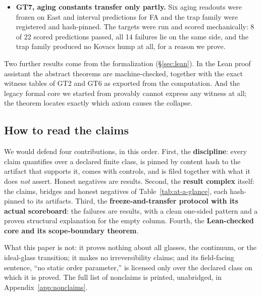 \begin{itemize}
    and no descriptor computed from that law, the fictive-temperature-like index included, is
    future-sufficient there. The gaps are tiny (about $10^{-10}$) but exact. The framework's
    fuller strict-extension filing, which also asks for multiple stable fixed points of a
    packaging map, does not pass on this shell, and we show why.
  \item \textbf{GT7, aging constants transfer only partly.} Six aging readouts were frozen on
    East and interval predictions for FA and the trap family were registered and hash-pinned. The
    targets were run and scored mechanically: 8 of 22 scored predictions passed, all 14 failures
    lie on the same side, and the trap family produced no Kovacs hump at all, for a reason we
    prove.
\end{itemize}

Two further results come from the formalization (\S\ref{sec:lean}). In the Lean proof assistant
the abstract theorems are machine-checked, together with the exact witness tables of GT2 and GT6
as exported from the computation. And the legacy formal core we started from provably cannot
express any witness at all; the theorem locates exactly which axiom causes the collapse.

\subsection{How to read the claims}

We would defend four contributions, in this order. First, the \textbf{discipline}: every claim
quantifies over a declared finite class, is pinned by content hash to the artifact that supports
it, comes with controls, and is filed together with what it does \emph{not} assert. Honest
negatives are results. Second, the \textbf{result complex} itself: the claims, bridges and honest
negatives of Table~\ref{tab:at-a-glance}, each hash-pinned to its artifacts. Third, the
\textbf{freeze-and-transfer protocol with its actual scoreboard}: the failures are results, with a
clean one-sided pattern and a proven structural explanation for the empty column. Fourth, the
\textbf{Lean-checked core and its scope-boundary theorem}.

What this paper is not: it proves nothing about all glasses, the continuum, or the ideal-glass
transition; it makes no irreversibility claims; and its field-facing sentence, ``no static order
parameter,'' is licensed only over the declared class on which it is proved. The full list of
nonclaims is printed, unabridged, in Appendix~\ref{app:nonclaims}.
